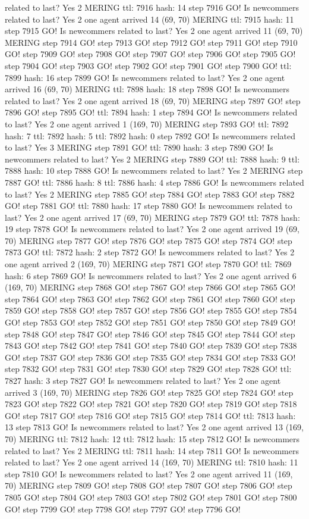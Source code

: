 related to last? Yes 2 MERING ttl: 7916 hash: 14 step 7916 GO! Is newcommers related to last? Yes 2 one agent arrived 14 (69, 70) MERING ttl: 7915 hash: 11 step 7915 GO! Is newcommers related to last? Yes 2 one agent arrived 11 (69, 70) MERING step 7914 GO! step 7913 GO! step 7912 GO! step 7911 GO! step 7910 GO! step 7909 GO! step 7908 GO! step 7907 GO! step 7906 GO! step 7905 GO! step 7904 GO! step 7903 GO! step 7902 GO! step 7901 GO! step 7900 GO! ttl: 7899 hash: 16 step 7899 GO! Is newcommers related to last? Yes 2 one agent arrived 16 (69, 70) MERING ttl: 7898 hash: 18 step 7898 GO! Is newcommers related to last? Yes 2 one agent arrived 18 (69, 70) MERING step 7897 GO! step 7896 GO! step 7895 GO! ttl: 7894 hash: 1 step 7894 GO! Is newcommers related to last? Yes 2 one agent arrived 1 (169, 70) MERING step 7893 GO! ttl: 7892 hash: 7 ttl: 7892 hash: 5 ttl: 7892 hash: 0 step 7892 GO! Is newcommers related to last? Yes 3 MERING step 7891 GO! ttl: 7890 hash: 3 step 7890 GO! Is newcommers related to last? Yes 2 MERING step 7889 GO! ttl: 7888 hash: 9 ttl: 7888 hash: 10 step 7888 GO! Is newcommers related to last? Yes 2 MERING step 7887 GO! ttl: 7886 hash: 8 ttl: 7886 hash: 4 step 7886 GO! Is newcommers related to last? Yes 2 MERING step 7885 GO! step 7884 GO! step 7883 GO! step 7882 GO! step 7881 GO! ttl: 7880 hash: 17 step 7880 GO! Is newcommers related to last? Yes 2 one agent arrived 17 (69, 70) MERING step 7879 GO! ttl: 7878 hash: 19 step 7878 GO! Is newcommers related to last? Yes 2 one agent arrived 19 (69, 70) MERING step 7877 GO! step 7876 GO! step 7875 GO! step 7874 GO! step 7873 GO! ttl: 7872 hash: 2 step 7872 GO! Is newcommers related to last? Yes 2 one agent arrived 2 (169, 70) MERING step 7871 GO! step 7870 GO! ttl: 7869 hash: 6 step 7869 GO! Is newcommers related to last? Yes 2 one agent arrived 6 (169, 70) MERING step 7868 GO! step 7867 GO! step 7866 GO! step 7865 GO! step 7864 GO! step 7863 GO! step 7862 GO! step 7861 GO! step 7860 GO! step 7859 GO! step 7858 GO! step 7857 GO! step 7856 GO! step 7855 GO! step 7854 GO! step 7853 GO! step 7852 GO! step 7851 GO! step 7850 GO! step 7849 GO! step 7848 GO! step 7847 GO! step 7846 GO! step 7845 GO! step 7844 GO! step 7843 GO! step 7842 GO! step 7841 GO! step 7840 GO! step 7839 GO! step 7838 GO! step 7837 GO! step 7836 GO! step 7835 GO! step 7834 GO! step 7833 GO! step 7832 GO! step 7831 GO! step 7830 GO! step 7829 GO! step 7828 GO! ttl: 7827 hash: 3 step 7827 GO! Is newcommers related to last? Yes 2 one agent arrived 3 (169, 70) MERING step 7826 GO! step 7825 GO! step 7824 GO! step 7823 GO! step 7822 GO! step 7821 GO! step 7820 GO! step 7819 GO! step 7818 GO! step 7817 GO! step 7816 GO! step 7815 GO! step 7814 GO! ttl: 7813 hash: 13 step 7813 GO! Is newcommers related to last? Yes 2 one agent arrived 13 (169, 70) MERING ttl: 7812 hash: 12 ttl: 7812 hash: 15 step 7812 GO! Is newcommers related to last? Yes 2 MERING ttl: 7811 hash: 14 step 7811 GO! Is newcommers related to last? Yes 2 one agent arrived 14 (169, 70) MERING ttl: 7810 hash: 11 step 7810 GO! Is newcommers related to last? Yes 2 one agent arrived 11 (169, 70) MERING step 7809 GO! step 7808 GO! step 7807 GO! step 7806 GO! step 7805 GO! step 7804 GO! step 7803 GO! step 7802 GO! step 7801 GO! step 7800 GO! step 7799 GO! step 7798 GO! step 7797 GO! step 7796 GO! 